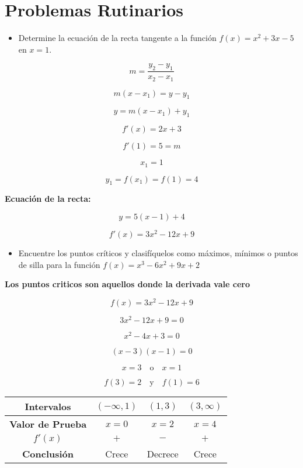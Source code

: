\section{Problemas Rutinarios}

\begin{itemize}
    \item Determine la ecuación de la recta tangente a la función \( f(x) = x^2 + 3x - 5 \) en \( x = 1 \).
\end{itemize}

\[m = \frac{y_2 - y_1}{x_2 - x_1}\]

\[m(x - x_1) = y - y_1\]

\[y = m(x - x_1) + y_1\]

\[f'(x) = 2x + 3\]

\[f'(1) = 5 = m\]

\[x_1 = 1\]

\[y_1 = f(x_1) = f(1) = 4\]

\textbf{Ecuación de la recta:}

\[y = 5(x - 1) + 4\]

\[f'(x) = 3x^2 - 12x + 9\]

\begin{itemize}
    \item Encuentre los puntos críticos y clasifíquelos como máximos, mínimos o puntos de silla para la función \(f(x)=x^3-6x^2+9x+2\)
\end{itemize}
\textbf{Los puntos criticos son aquellos donde la derivada vale cero}

\[
f(x) = 3x^2 - 12x + 9
\]

\[
3x^2 - 12x + 9 = 0
\]

\[
x^2 - 4x + 3 = 0
\]

\[
(x - 3)(x - 1) = 0
\]

\[
x = 3 \quad \text{o} \quad x = 1
\]

\[
f(3) = 2 
\quad \text{y} \quad
f(1) = 6
\]


\begin{center}
    \begin{tabular}{|c|c|c|c|}
        \hline
        \textbf{Intervalos} & $(-\infty, 1)$ & $(1, 3)$ & $(3, \infty)$ \\
        \hline
        \textbf{Valor de Prueba} & $x = 0$ & $x = 2$ & $x = 4$ \\
        \hline
        \textbf{$f'(x)$} & $+$ & $-$ & $+$ \\
        \hline
        \textbf{Conclusión} & Crece & Decrece & Crece \\
        \hline
    \end{tabular}
\end{center}

